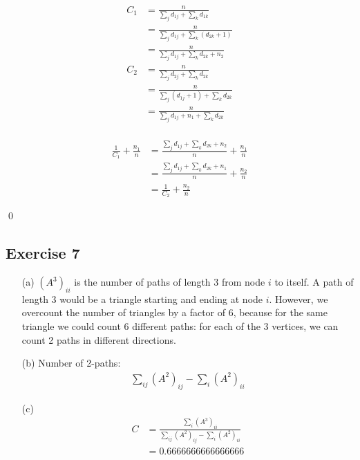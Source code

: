 \documentclass{article}
\begin{document}
\begin{align*}
  C_1 &= \frac{n}{\sum_{j} d_{1j} + \sum_{k} d_{1k}} \\
  &= \frac{n}{\sum_{j} d_{1j} + \sum_{k} (d_{2k} + 1)} \\
  &= \frac{n}{\sum_{j} d_{1j} + \sum_{k} d_{2k} + n_2} \\
  C_2 &= \frac{n}{\sum_{j} d_{2j} + \sum_{k} d_{2k}} \\
  &= \frac{n}{\sum_{j} (d_{1j} + 1) + \sum_{k} d_{2k}} \\
  &= \frac{n}{\sum_{j} d_{1j} + n_1 + \sum_{k} d_{2k}} \\
\end{align*}

\begin{align*}
  \frac{1}{C_1} + \frac{n_1}{n}
  &= \frac{\sum_{j} d_{1j} + \sum_{k} d_{2k} + n_2}{n} + \frac{n_1}{n} \\
  &= \frac{\sum_{j} d_{1j} + \sum_{k} d_{2k} + n_1}{n} + \frac{n_2}{n} \\
  &= \frac{1}{C_2} + \frac{n_2}{n}
\end{align*}

\qed

\newpage

\subsection*{Exercise 7}

\begin{enumerate}
  \item[(a)]
  \( (A^3)_{ii} \) is the number of paths of length 3 from node \( i \) to
  itself. A path of length 3 would be a triangle starting and ending at node \(
  i \). However, we overcount the number of triangles by a factor of 6, because
  for the same triangle we could count 6 different paths: for each of the 3
  vertices, we can count 2 paths in different directions.

  \item[(b)]
  Number of 2-paths:
  \begin{align*}
    \sum_{ij} (A^2)_{ij} - \sum_{i} (A^2)_{ii}
  \end{align*}

  \item[(c)]
  \begin{align*}
    C &= \frac{\sum_{i} (A^3)_{ii}}{\sum_{ij} (A^2)_{ij} - \sum_{i} (A^2)_{ii}} \\
    &= \boxed{0.6666666666666666}
  \end{align*}
\end{enumerate}
\end{document}
